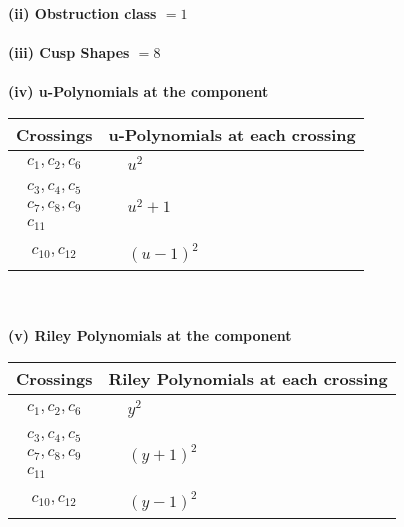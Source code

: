 \documentclass[1p]{elsarticle_modified}
\theoremstyle{definition}
\begin{document}
\flushleft \textbf{(ii) Obstruction class $= 1$}\\~\\
\flushleft \textbf{(iii) Cusp Shapes $= 8$}\\~\\
\newpage\renewcommand{\arraystretch}{1}
\flushleft \textbf{(iv) u-Polynomials at the component}\newline \\
\begin{tabular}{m{50pt}|m{274pt}}
Crossings & \hspace{64pt}u-Polynomials at each crossing \\
\hline $$\begin{aligned}c_{1},c_{2},c_{6}\end{aligned}$$&$\begin{aligned}
&u^2
\end{aligned}$\\
\hline $$\begin{aligned}c_{3},c_{4},c_{5}\\c_{7},c_{8},c_{9}\\c_{11}\end{aligned}$$&$\begin{aligned}
&u^2+1
\end{aligned}$\\
\hline $$\begin{aligned}c_{10},c_{12}\end{aligned}$$&$\begin{aligned}
&(u-1)^2
\end{aligned}$\\
\hline
\end{tabular}\\~\\
\newpage\renewcommand{\arraystretch}{1}
\flushleft \textbf{(v) Riley Polynomials at the component}\newline \\
\begin{tabular}{m{50pt}|m{274pt}}
Crossings & \hspace{64pt}Riley Polynomials at each crossing \\
\hline $$\begin{aligned}c_{1},c_{2},c_{6}\end{aligned}$$&$\begin{aligned}
&y^2
\end{aligned}$\\
\hline $$\begin{aligned}c_{3},c_{4},c_{5}\\c_{7},c_{8},c_{9}\\c_{11}\end{aligned}$$&$\begin{aligned}
&(y+1)^2
\end{aligned}$\\
\hline $$\begin{aligned}c_{10},c_{12}\end{aligned}$$&$\begin{aligned}
&(y-1)^2
\end{aligned}$\\
\hline
\end{tabular}\\~\\
\end{document}
